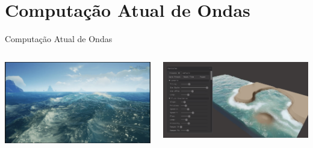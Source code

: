 \documentclass[aspectratio=169,xcolor=table]{beamer}
\begin{document}
\section{Computação Atual de Ondas}
\begin{frame}{Computação Atual de Ondas}
    \begin{columns}
        \centering
        \includegraphics[width=\textwidth]{imgs/sea-of-thieves.png}
        
        \centering
        \includegraphics[width=\textwidth]{imgs/river-editor.png}
    \end{columns}
\end{frame}
\end{document}
